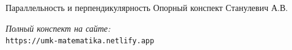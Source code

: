\documentclass{umk-matematika}
\begin{document}
\maketitlepage
    {Параллельность и перпендикулярность}
    {Опорный конспект}
    {Станулевич А.В.}

\begin{center}
\vspace{1.5cm}
\textit{Полный конспект на сайте:}\\
\texttt{https://umk-matematika.netlify.app}
\end{center}
\end{document}
